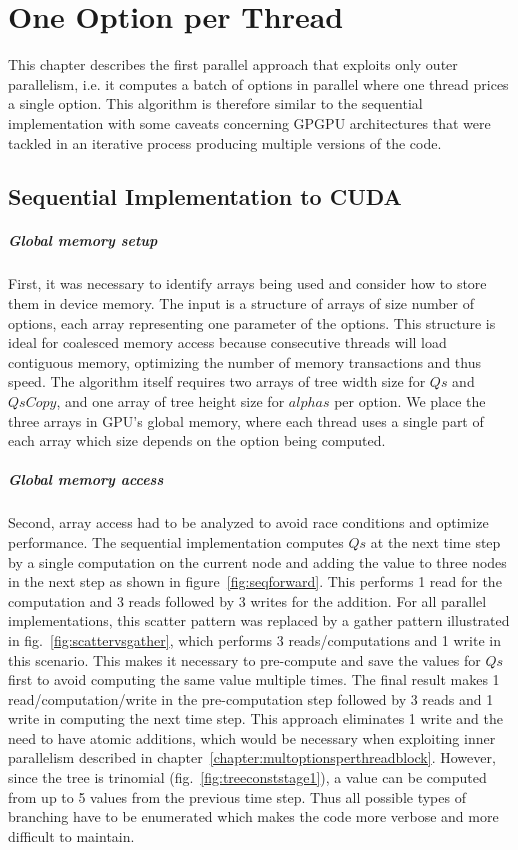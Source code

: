 \chapter{One Option per Thread}
\label{chapter:oneoptionperthread}
This chapter describes the first parallel approach that exploits only outer parallelism, i.e. it computes a batch of options in parallel where one thread prices a single option. 
This algorithm is therefore similar to the sequential implementation with some caveats concerning GPGPU architectures that were tackled in an iterative process producing multiple versions of the code.

\section{Sequential Implementation to CUDA}
\paragraph{Global memory setup}
First, it was necessary to identify arrays being used and consider how to store them in device memory. The input is a structure of arrays of size number of options, each array representing one parameter of the options. This structure is ideal for coalesced memory access because consecutive threads will load contiguous memory, optimizing the number of memory transactions and thus speed. The algorithm itself requires two arrays of tree width size for $\mathit{Qs}$ and $\mathit{QsCopy}$, and one array of tree height size for $\mathit{alphas}$ per option. We place the three arrays in GPU's global memory, where each thread uses a single part of each array which size depends on the option being computed.

\paragraph{Global memory access}
Second, array access had to be analyzed to avoid race conditions and optimize performance. The sequential implementation computes $\mathit{Qs}$ at the next time step by a single computation on the current node and adding the value to three nodes in the next step as shown in figure~\ref{fig:seqforward}. This performs 1 read for the computation and 3 reads followed by 3 writes for the addition. For all parallel implementations, this scatter pattern was replaced by a gather pattern illustrated in fig.~\ref{fig:scattervsgather}, which performs 3 reads/computations and 1 write in this scenario. This makes it necessary to pre-compute and save the values for $\mathit{Qs}$ first to avoid computing the same value multiple times. The final result makes 1 read/computation/write in the pre-computation step followed by 3 reads and 1 write in computing the next time step. This approach eliminates 1 write and the need to have atomic additions, which would be necessary when exploiting inner parallelism described in chapter~\ref{chapter:multoptionsperthreadblock}. However, since the tree is trinomial (fig.~\ref{fig:treeconststage1}), a value can be computed from up to 5 values from the previous time step. Thus all possible types of branching have to be enumerated which makes the code more verbose and more difficult to maintain.


